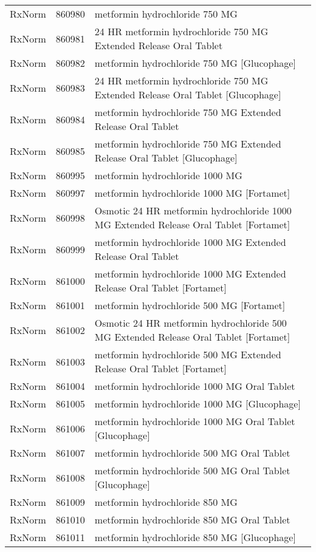 \begin{longtable}{p{}p{}p{}}
  RxNorm & 860980 & metformin hydrochloride 750 MG \\ 
  RxNorm & 860981 & 24 HR metformin hydrochloride 750 MG Extended Release Oral Tablet \\ 
  RxNorm & 860982 & metformin hydrochloride 750 MG [Glucophage] \\ 
  RxNorm & 860983 & 24 HR metformin hydrochloride 750 MG Extended Release Oral Tablet [Glucophage] \\ 
  RxNorm & 860984 & metformin hydrochloride 750 MG Extended Release Oral Tablet \\ 
  RxNorm & 860985 & metformin hydrochloride 750 MG Extended Release Oral Tablet [Glucophage] \\ 
  RxNorm & 860995 & metformin hydrochloride 1000 MG \\ 
  RxNorm & 860997 & metformin hydrochloride 1000 MG [Fortamet] \\ 
  RxNorm & 860998 & Osmotic 24 HR metformin hydrochloride 1000 MG Extended Release Oral Tablet [Fortamet] \\ 
  RxNorm & 860999 & metformin hydrochloride 1000 MG Extended Release Oral Tablet \\ 
  RxNorm & 861000 & metformin hydrochloride 1000 MG Extended Release Oral Tablet [Fortamet] \\ 
  RxNorm & 861001 & metformin hydrochloride 500 MG [Fortamet] \\ 
  RxNorm & 861002 & Osmotic 24 HR metformin hydrochloride 500 MG Extended Release Oral Tablet [Fortamet] \\ 
  RxNorm & 861003 & metformin hydrochloride 500 MG Extended Release Oral Tablet [Fortamet] \\ 
  RxNorm & 861004 & metformin hydrochloride 1000 MG Oral Tablet \\ 
  RxNorm & 861005 & metformin hydrochloride 1000 MG [Glucophage] \\ 
  RxNorm & 861006 & metformin hydrochloride 1000 MG Oral Tablet [Glucophage] \\ 
  RxNorm & 861007 & metformin hydrochloride 500 MG Oral Tablet \\ 
  RxNorm & 861008 & metformin hydrochloride 500 MG Oral Tablet [Glucophage] \\ 
  RxNorm & 861009 & metformin hydrochloride 850 MG \\ 
  RxNorm & 861010 & metformin hydrochloride 850 MG Oral Tablet \\ 
  RxNorm & 861011 & metformin hydrochloride 850 MG [Glucophage] \\ 

\end{longtable}
